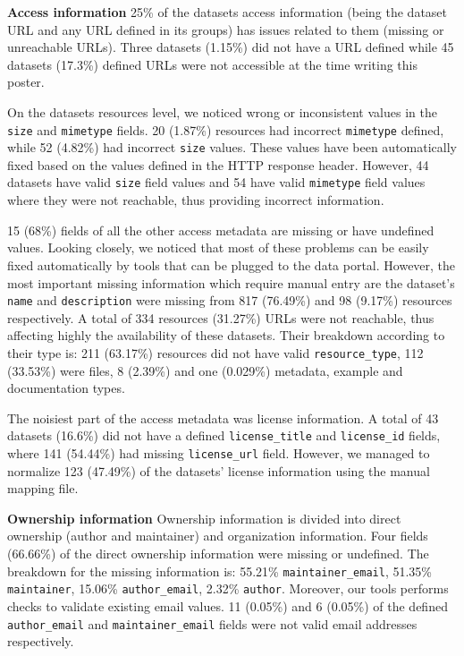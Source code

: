 \documentclass{../../Tools/LaTEX/sig-alternate}
\begin{document}
\textbf{Access information} 25\% of the datasets access information (being the dataset URL and any URL defined in its groups) has issues related to them (missing or unreachable URLs).
Three datasets (1.15\%) did not have a URL defined while 45 datasets (17.3\%) defined URLs were not accessible at the time writing this poster.

On the datasets resources level, we noticed wrong or inconsistent values in the \texttt{size} and \texttt{mimetype} fields. 20 (1.87\%) resources had incorrect \texttt{mimetype} defined, while 52 (4.82\%) had incorrect \texttt{size} values. These values have been automatically fixed based on the values defined in the HTTP response header. However, 44 datasets have valid \texttt{size} field values and 54 have valid \texttt{mimetype} field values where they were not reachable, thus providing incorrect information.

15 (68\%) fields of all the other access metadata are missing or have undefined values. Looking closely, we noticed that most of these problems can be easily fixed automatically by tools that can be plugged to the data portal. However, the most important missing information which require manual entry are the dataset's \texttt{name} and \texttt{description} were missing from 817 (76.49\%) and 98 (9.17\%) resources respectively.
A total of 334 resources (31.27\%) URLs were not reachable, thus affecting highly the availability of these datasets. Their breakdown according to their type is: 211 (63.17\%) resources did not have valid \texttt{resource\_type}, 112 (33.53\%) were files, 8 (2.39\%) and one (0.029\%) metadata, example and documentation types.

The noisiest part of the access metadata was license information. A total of 43 datasets (16.6\%) did not have a defined \texttt{license\_title} and \texttt{license\_id} fields, where 141 (54.44\%) had missing \texttt{license\_url} field. However, we managed to normalize 123 (47.49\%) of the datasets' license information using the manual mapping file.

\textbf{Ownership information} Ownership information is divided into direct ownership (author and maintainer) and organization information. Four fields (66.66\%) of the direct ownership information were missing or undefined. The breakdown for the missing information is: 55.21\% \texttt{maintainer\_email}, 51.35\% \texttt{maintainer}, 15.06\% \texttt{author\_email}, 2.32\% \texttt{author}. Moreover, our tools performs checks to validate existing email values. 11 (0.05\%) and 6 (0.05\%) of the defined \texttt{author\_email} and \texttt{maintainer\_email} fields were not valid email addresses respectively.
\end{document}
